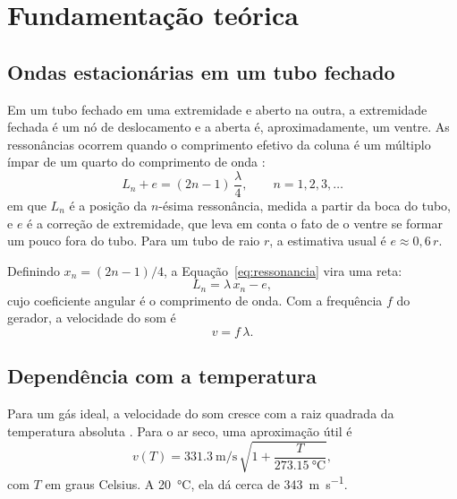 \chapter{Fundamentação teórica}
\label{cap:fundamentacao}

\section{Ondas estacionárias em um tubo fechado}

Em um tubo fechado em uma extremidade e aberto na outra, a extremidade fechada é um nó de deslocamento e a aberta é, aproximadamente, um ventre. As ressonâncias ocorrem quando o comprimento efetivo da coluna é um múltiplo ímpar de um quarto do comprimento de onda \cite{halliday2016}:
\begin{equation}
  L_n + e = (2n-1)\,\frac{\lambda}{4}, \qquad n = 1, 2, 3, \dots
  \label{eq:ressonancia}
\end{equation}
em que $L_n$ é a posição da $n$-ésima ressonância, medida a partir da boca do tubo, e $e$ é a correção de extremidade, que leva em conta o fato de o ventre se formar um pouco fora do tubo. Para um tubo de raio $r$, a estimativa usual é $e \approx 0{,}6\,r$.

Definindo $x_n = (2n-1)/4$, a Equação~\eqref{eq:ressonancia} vira uma reta:
\begin{equation}
  L_n = \lambda\,x_n - e,
  \label{eq:reta}
\end{equation}
cujo coeficiente angular é o comprimento de onda. Com a frequência $f$ do gerador, a velocidade do som é
\begin{equation}
  v = f\,\lambda.
  \label{eq:velocidade}
\end{equation}

\section{Dependência com a temperatura}

Para um gás ideal, a velocidade do som cresce com a raiz quadrada da temperatura absoluta \cite{nussenzveig2014}. Para o ar seco, uma aproximação útil é
\begin{equation}
  v(T) = \qty{331.3}{\metre\per\second}\,\sqrt{1 + \frac{T}{\qty{273.15}{\celsius}}},
  \label{eq:temperatura}
\end{equation}
com $T$ em graus Celsius. A \qty{20}{\celsius}, ela dá cerca de \qty{343}{\metre\per\second}.

